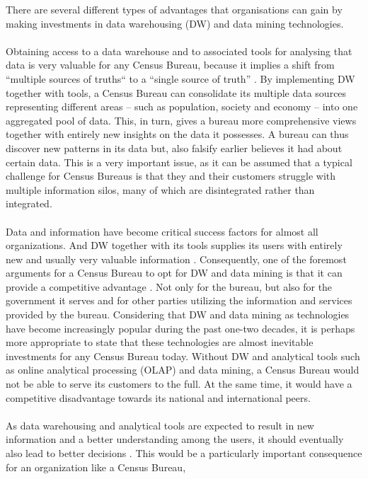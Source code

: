 There are several different types of advantages that organisations can gain by making investments in data warehousing (DW) and data mining technologies.
\\\\
Obtaining access to a data warehouse and to associated tools for analysing that data is very valuable for any Census Bureau, 
because it implies a shift from “multiple sources of truths“ to a “single source of truth” \cite{l2video}. 
By implementing DW together with tools, a Census Bureau can consolidate its multiple data sources representing different areas -- 
such as population, society and economy -- into one aggregated pool of data. 
This, in turn, gives a bureau more comprehensive views together with entirely new insights on the data it possesses. 
A bureau can thus discover new patterns in its data but, also falsify earlier believes it had about certain data. 
This is a very important issue, 
as it can be assumed that a typical challenge for Census Bureaus is that they and their customers struggle with multiple information silos, 
many of which are disintegrated rather than integrated.
\\\\
Data and information have become critical success factors for almost all organizations. 
And DW together with its tools supplies its users with entirely new and usually very valuable information \cite[chapter~31.1.3]{CourseLitt}. 
Consequently, one of the foremost arguments for a Census Bureau to opt for DW and data mining is that it can provide a competitive advantage \cite{l2video}. 
Not only for the bureau, but also for the government it serves and for other parties utilizing the information and services provided by the bureau. 
Considering that DW and data mining as technologies have become increasingly popular during the past one-two decades, 
it is perhaps more appropriate to state that these technologies are almost inevitable investments for any Census Bureau today. 
Without DW and analytical tools such as online analytical processing (OLAP) and data mining, 
a Census Bureau would not be able to serve its customers to the full. 
At the same time, it would have a competitive disadvantage towards its national and international peers.
\\\\
As data warehousing and analytical tools are expected to result in new information and a better understanding among the users,
it should eventually also lead to better decisions \cite[chapter~31.1.3]{CourseLitt}. 
This would be a particularly important consequence for an organization like a Census Bureau, 
